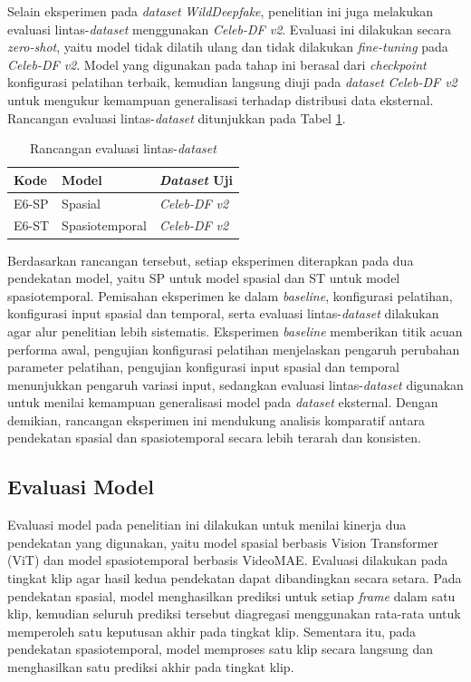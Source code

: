 Selain eksperimen pada \textit{dataset} \textit{WildDeepfake}, penelitian ini juga melakukan evaluasi lintas-\textit{dataset} menggunakan \textit{Celeb-DF v2}. Evaluasi ini dilakukan secara \textit{zero-shot}, yaitu model tidak dilatih ulang dan tidak dilakukan \textit{fine-tuning} pada \textit{Celeb-DF v2}. Model yang digunakan pada tahap ini berasal dari \textit{checkpoint} konfigurasi pelatihan terbaik, kemudian langsung diuji pada \textit{dataset} \textit{Celeb-DF v2} untuk mengukur kemampuan generalisasi terhadap distribusi data eksternal. Rancangan evaluasi lintas-\textit{dataset} ditunjukkan pada Tabel \ref{tab:3.rancangan-cross-dataset}. \par

\begin{table}[H]
\centering
\caption{Rancangan evaluasi lintas-\textit{dataset}}
\label{tab:3.rancangan-cross-dataset}
\begin{tabular}{lll}
\toprule
\textbf{Kode} & \textbf{Model} & \textbf{\textit{Dataset} Uji} \\
\midrule
E6-SP & Spasial & \textit{Celeb-DF v2} \\
E6-ST & Spasiotemporal & \textit{Celeb-DF v2} \\
\bottomrule
\end{tabular}
\end{table}
\par

Berdasarkan rancangan tersebut, setiap eksperimen diterapkan pada dua pendekatan model, yaitu SP untuk model spasial dan ST untuk model spasiotemporal. Pemisahan eksperimen ke dalam \textit{baseline}, konfigurasi pelatihan, konfigurasi input spasial dan temporal, serta evaluasi lintas-\textit{dataset} dilakukan agar alur penelitian lebih sistematis. Eksperimen \textit{baseline} memberikan titik acuan performa awal, pengujian konfigurasi pelatihan menjelaskan pengaruh perubahan parameter pelatihan, pengujian konfigurasi input spasial dan temporal menunjukkan pengaruh variasi input, sedangkan evaluasi lintas-\textit{dataset} digunakan untuk menilai kemampuan generalisasi model pada \textit{dataset} eksternal. Dengan demikian, rancangan eksperimen ini mendukung analisis komparatif antara pendekatan spasial dan spasiotemporal secara lebih terarah dan konsisten. \par

\subsection{Evaluasi Model} \label{III.Evaluasi Model}
Evaluasi model pada penelitian ini dilakukan untuk menilai kinerja dua pendekatan yang digunakan, yaitu model spasial berbasis Vision Transformer (ViT) dan model spasiotemporal berbasis VideoMAE. Evaluasi dilakukan pada tingkat klip agar hasil kedua pendekatan dapat dibandingkan secara setara. Pada pendekatan spasial, model menghasilkan prediksi untuk setiap \textit{frame} dalam satu klip, kemudian seluruh prediksi tersebut diagregasi menggunakan rata-rata untuk memperoleh satu keputusan akhir pada tingkat klip. Sementara itu, pada pendekatan spasiotemporal, model memproses satu klip secara langsung dan menghasilkan satu prediksi akhir pada tingkat klip. \par

